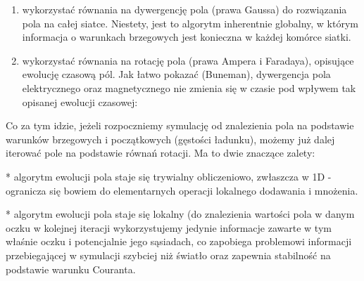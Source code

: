 \begin{enumerate}
    \item wykorzystać równania na dywergencję pola (prawa Gaussa) do
    rozwiązania pola na całej siatce. Niestety, jest to algorytm
    inherentnie globalny, w którym informacja o warunkach brzegowych
    jest konieczna w każdej komórce siatki.

    \item wykorzystać równania na rotację pola (prawa Ampera i Faradaya),
    opisujące ewolucję czasową pól. Jak łatwo pokazać (Buneman), dywergencja
    pola elektrycznego oraz magnetycznego nie zmienia się w czasie pod
    wpływem tak opisanej ewolucji czasowej:
\end{enumerate}

Co za tym idzie, jeżeli rozpoczniemy symulację od znalezienia pola na
podstawie warunków brzegowych i początkowych (gęstości ładunku), możemy już
dalej iterować pole na podstawie równań rotacji. Ma to dwie znaczące
zalety:

* algorytm ewolucji pola staje się trywialny obliczeniowo,
zwłaszcza w 1D - ogranicza się bowiem do elementarnych operacji lokalnego
dodawania i mnożenia.

* algorytm ewolucji pola staje się lokalny (do
znalezienia wartości pola w danym oczku w kolejnej iteracji wykorzystujemy
jedynie informacje zawarte w tym właśnie oczku i potencjalnie jego
sąsiadach, co zapobiega
problemowi informacji przebiegającej w symulacji szybciej niż światło oraz
zapewnia stabilność na podstawie warunku Couranta.


%
%
%

